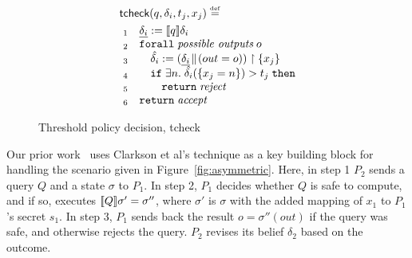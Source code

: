 \documentclass[10pt]{sigplanconf}
\newcommand{\kw}[1]{\mathtt{#1}}
\newcommand{\polc}{\textsf{tcheck}}
\begin{document}
\begin{figure}[t]
\[
\begin{array}{l}
\polc(q, \delta_i, t_j, x_j) \defeq \\
\\[-2ex]
~_1\quad \underline{\delta_i} := \pevalp{q}\delta_i \\
~_2\quad \kw{forall}\;\emph{possible outputs}\; o\; \\
~_3\quad\quad \hat{\delta_i} := \project{(\revise{\underline{\delta_i}}{(out =  o)})}{\{x_j\}} \\
~_4\quad\quad \kw{if}\; \exists n.\; \hat{\delta_i}(\{x_j = n \}) > t_j\;\kw{then} \\
~_5\quad\quad\quad \kw{return}\; \emph{reject} \\
~_6\quad \kw{return}\; \emph{accept}
\end{array}
\]
\caption{Threshold policy decision, \polc} \label{alg:policy}
\end{figure}

Our prior work~\cite{mardziel11belief} uses Clarkson et al's technique
as a key building block for handling the scenario given in
Figure~\ref{fig:asymmetric}.  Here, in step 1 $P_2$ sends a query $Q$
and a state $\sigma$ to $P_1$.  In step 2, $P_1$ decides whether $Q$
is safe to compute, and if so, executes $[\![{Q}]\!]{\sigma'} =
\sigma''$, where $\sigma'$ is $\sigma$ with the added mapping of $x_1$
to $P_1$'s secret $s_1$.  In step 3, $P_1$ sends back the result
$o = \sigma''(out)$ if the query was safe, and otherwise rejects the
query.  $P_2$ revises its belief $\delta_2$ based on the outcome.
\end{document}
